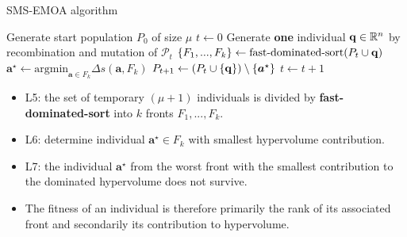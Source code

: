 \begin{frame}[allowframebreaks]{SMS-EMOA algorithm}

\begin{algorithm}[H]
  \begin{center}
  \caption{SMS-EMOA}
    \begin{algorithmic}[1]
    \begin{footnotesize}
    \STATE Generate start population $P_0$ of size $\mu$
    \STATE $t \leftarrow 0$
      \REPEAT
        \STATE Generate \textbf{one} individual $\mathbf{q} \in \mathbb{R}^n$ by recombination and mutation of $\mathcal{P}_t$ %
        \STATE $\{F_{1},..., F_k\} \leftarrow \text{fast-dominated-sort}(P_{t}\cup \mathbf{q})$
        \STATE $\bm{a}^\star \leftarrow \text{argmin}_{\bm{a} \in F_{k}}\Delta s(\bm{a}, F_{k})$
        \STATE $P_{t+1} \leftarrow (P_t \cup \{\mathbf{q}\}) \setminus\{\bm{a}^\star\}$
        \STATE $ t \leftarrow t+1$
    \end{footnotesize}
    \vspace*{-0.3cm}
    \end{algorithmic}
    \end{center}
\end{algorithm}
    \vspace{-0.5cm}
\scriptsize
\begin{itemize}
\item L5: the set of temporary $(\mu + 1)$ individuals is divided by \textbf{fast-dominated-sort} into $k$ fronts $F_{1},...,F_{k}$. %
\item L6: determine individual $\bm{a}^\star \in F_{k}$ with smallest hypervolume contribution.
\item L7: the individual $\bm{a}^\star$ from the worst front with the smallest contribution to the dominated hypervolume does not survive.
\item The fitness of an individual is therefore primarily the rank of its associated front and secondarily its contribution to hypervolume.
\end{itemize}
\end{frame}



